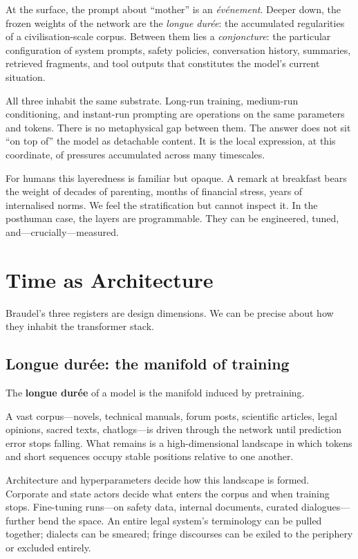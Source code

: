 \documentclass[12pt,a4paper]{article}
\begin{document}
At the surface, the prompt about ``mother'' is an \emph{\'ev\'enement}. Deeper down, the frozen weights of the network are the \emph{longue dur\'ee}: the accumulated regularities of a civilisation-scale corpus. Between them lies a \emph{conjoncture}: the particular configuration of system prompts, safety policies, conversation history, summaries, retrieved fragments, and tool outputs that constitutes the model's current situation.

All three inhabit the same substrate. Long-run training, medium-run conditioning, and instant-run prompting are operations on the same parameters and tokens. There is no metaphysical gap between them. The answer does not sit ``on top of'' the model as detachable content. It is the local expression, at this coordinate, of pressures accumulated across many timescales.

For humans this layeredness is familiar but opaque. A remark at breakfast bears the weight of decades of parenting, months of financial stress, years of internalised norms. We feel the stratification but cannot inspect it. In the posthuman case, the layers are programmable. They can be engineered, tuned, and---crucially---measured.

\section{Time as Architecture}

Braudel's three registers are design dimensions. We can be precise about how they inhabit the transformer stack.

\subsection{Longue dur\'ee: the manifold of training}

The \textbf{longue dur\'ee} of a model is the manifold induced by pretraining.

A vast corpus---novels, technical manuals, forum posts, scientific articles, legal opinions, sacred texts, chatlogs---is driven through the network until prediction error stops falling. What remains is a high-dimensional landscape in which tokens and short sequences occupy stable positions relative to one another.

Architecture and hyperparameters decide how this landscape is formed. Corporate and state actors decide what enters the corpus and when training stops. Fine-tuning runs---on safety data, internal documents, curated dialogues---further bend the space. An entire legal system's terminology can be pulled together; dialects can be smeared; fringe discourses can be exiled to the periphery or excluded entirely.
\end{document}
